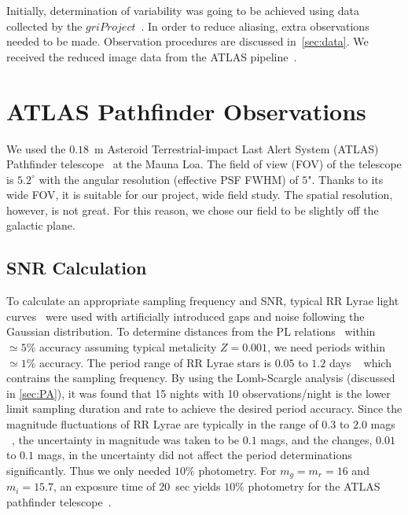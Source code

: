 \documentclass[aps,prb,twocolumn,superscriptaddress]{revtex4-1}
\begin{document}
Initially, determination of variability was going to be achieved using data collected by the $gri Project$~\cite{gri}.  %
In order to reduce aliasing, extra observations needed to be made.  Observation procedures are discussed in~\cref{sec:data}.
We received the reduced image data from the ATLAS pipeline~\cite{gri}.


\section{ATLAS Pathfinder Observations}


We used the $0.18$~m Asteroid Terrestrial-impact Last Alert System (ATLAS) Pathfinder telescope~\citep{fallingstar} at the Mauna Loa. The field of view (FOV) of the telescope is $5.2^{\circ}$ with the angular resolution (effective PSF FWHM) of $5$". Thanks to its wide FOV, it is suitable for our project, wide field study. The spatial resolution, however, is not great. For this reason, we chose our field to be slightly off the galactic plane.



\subsection{SNR Calculation}\label{sec:SNR}

To calculate an appropriate sampling frequency and SNR, typical RR Lyrae light curves~\cite{RRLyrae} were used with artificially introduced gaps and noise following the Gaussian distribution. To determine distances from the PL relations~\citep{PL} within $\simeq5\%$ accuracy assuming typical metalicity $Z=0.001$, we need periods within $\simeq1\%$ accuracy. The period range of RR Lyrae stars is $0.05$ to $1.2$ days ~\cite{Astro} which contrains the sampling frequency. By using the Lomb-Scargle analysis (discussed in \cref{sec:PA}), it was found that 15 nights with 10 observations/night is the lower limit sampling duration and rate to achieve the desired period accuracy. Since the magnitude fluctuations of RR Lyrae are typically in the range of $0.3$ to $2.0$ mags ~\cite{AAVSO}, the uncertainty in magnitude was taken to be $0.1$ mags, and the changes, $0.01$ to $0.1$ mags, in the uncertainty did not affect the period determinations significantly. Thus we only needed $10\%$ photometry. For $m_g = m_r = 16$ and $m_i = 15.7$, an exposure time of $20$~sec yields $10\%$ photometry for the ATLAS pathfinder telescope~\citep{fallingstar}.
\end{document}
